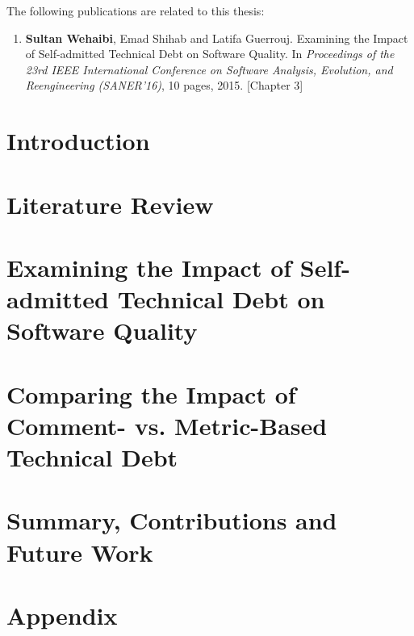 \documentclass[12pt]{report}
\begin{document}
\begin{publications}

The following publications are related to this thesis:

\begin{enumerate}

\item \textbf{Sultan Wehaibi}, Emad Shihab and Latifa Guerrouj. Examining the Impact of Self-admitted Technical Debt on Software Quality. In \textit{Proceedings of the 23rd IEEE International Conference on Software Analysis, Evolution, and Reengineering (SANER’16)}, 10 pages, 2015. [Chapter 3]


\end{enumerate}

\end{publications}

\chapter{Introduction}
\label{introduction}


\chapter{Literature Review}
\label{literature_review}


\chapter{Examining the Impact of Self-admitted Technical Debt on Software Quality}
\label{chapter3}


\chapter{Comparing the Impact of Comment- vs. Metric-Based Technical Debt}
\label{chapter4}


\chapter{Summary, Contributions and Future Work}
\label{conclusion}



\chapter{Appendix}
\label{appendix}


  

\end{document}
